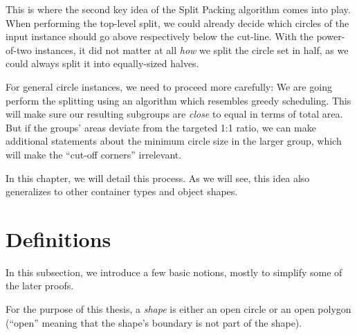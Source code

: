 \documentclass[a4paper,style=print,oneside,bibliography=totoc,nexus,lnum,extramargin]{tubsbook}
\begin{document}
This is where the second key idea of the Split Packing algorithm comes into play.
When performing the top-level split, we could already decide which circles of the input instance should go above respectively below the cut-line. With the power-of-two instances, it did not matter at all \emph{how} we split the circle set in half, as we could always split it into equally-sized halves.

For general circle instances, we need to proceed more carefully: We are going perform the splitting using an algorithm which resembles greedy scheduling. This will make sure our resulting subgroups are \emph{close} to equal in terms of total area. But if the groups' areas deviate from the targeted 1:1 ratio, we can make additional statements about the minimum circle size in the larger group, which will make the “cut-off corners” irrelevant.

In this chapter, we will detail this process. As we will see, this idea also generalizes to other container types and object shapes.




\section{Definitions}

In this subsection, we introduce a few basic notions, mostly to simplify some of the later proofs.

\begin{definition}
    For the purpose of this thesis, a \emph{shape} is either an open circle or an open polygon (“open” meaning that the shape's boundary is not part of the shape).
\end{definition}
\end{document}
